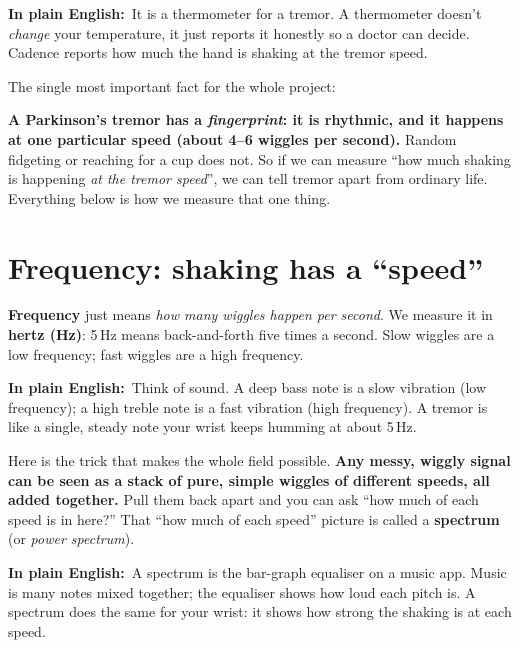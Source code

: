 \documentclass[11pt]{article}
\newcommand{\pe}{\textbf{\color{teal}In plain English:}\ }
\begin{document}
\begin{plain}
\pe It is a thermometer for a tremor. A thermometer doesn't \emph{change} your
temperature, it just reports it honestly so a doctor can decide. Cadence reports
how much the hand is shaking at the tremor speed.
\end{plain}

\noindent The single most important fact for the whole project:

\begin{keyidea}
\textbf{A Parkinson's tremor has a \emph{fingerprint}: it is rhythmic, and it
happens at one particular speed (about 4--6 wiggles per second).} Random
fidgeting or reaching for a cup does not. So if we can measure ``how much
shaking is happening \emph{at the tremor speed}'', we can tell tremor apart from
ordinary life. Everything below is how we measure that one thing.
\end{keyidea}

\section{Frequency: shaking has a ``speed''}

\textbf{Frequency} just means \emph{how many wiggles happen per second}. We
measure it in \textbf{hertz (Hz)}: 5\,Hz means back-and-forth five times a
second. Slow wiggles are a low frequency; fast wiggles are a high frequency.

\pe Think of sound. A deep bass note is a slow vibration (low frequency); a high
treble note is a fast vibration (high frequency). A tremor is like a single,
steady note your wrist keeps humming at about 5\,Hz.

Here is the trick that makes the whole field possible. \textbf{Any messy,
wiggly signal can be seen as a stack of pure, simple wiggles of different speeds,
all added together.} Pull them back apart and you can ask ``how much of each
speed is in here?'' That ``how much of each speed'' picture is called a
\textbf{spectrum} (or \emph{power spectrum}).

\pe A spectrum is the bar-graph equaliser on a music app. Music is many notes
mixed together; the equaliser shows how loud each pitch is. A spectrum does the
same for your wrist: it shows how strong the shaking is at each speed.
\end{document}
